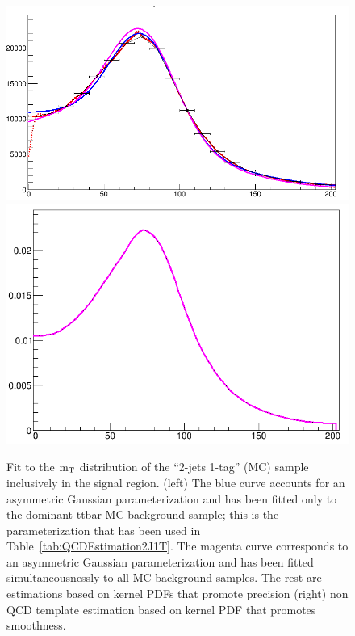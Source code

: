 {\begin{figure}[h!]
\centering{}\includegraphics[scale=0.2]{figures/2J1T/MTW_unbinnedfit_variousmodels_2j1t_lessiso_inclusive_mTop_range_ttbar}\includegraphics[scale=0.2]{figures/2J1T/MTW_unbinnedfit_smoothkernel_2j1t_lessiso_inclusive_mTop_range_ttbar}\caption{\label{fig:nonQCD_template_Unbinned}Fit to the ${\rm m_{T}}$ distribution
of the \textquotedblleft{}2-jets 1-tag\textquotedblright{} (MC) sample
inclusively in the signal region. (left) The blue curve accounts
for an asymmetric Gaussian parameterization and has been fitted only
to the dominant ttbar MC background sample; this is the parameterization
that has been used in Table~\ref{tab:QCDEstimation2J1T}. The magenta curve corresponds to an
asymmetric Gaussian parameterization and has been fitted simultaneousnessly
to all MC background samples. The rest are estimations based on kernel
PDFs that promote precision (right) non QCD template estimation based
on kernel PDF that promotes smoothness.}
\end{figure}

}
